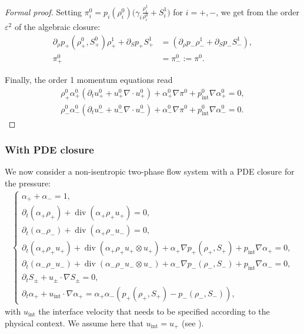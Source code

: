 \documentclass[11pt, twoside, a4paper]{article}
\theoremstyle{plain}
\theoremstyle{remark}
\numberwithin{equation}{section}
\renewcommand{\div}{\operatorname{div}}
\newcommand{\dt}{\partial_t}
\newcommand{\eps}{\varepsilon}
\newcommand{\ap}{\alpha_+}
\newcommand{\am}{\alpha_-}
\newcommand{\rp}{\rho_+}
\newcommand{\rmi}{\rho_-}
\begin{document}
\begin{proof}[Formal proof]
Setting $\pi_i^0 = p_i(\rho_i^0) \Big( \gamma_i \frac{\rho_i^1}{\rho_i^0} + S_i^1 \Big)$ for $i=+,-$, we get from the order $\eps^2$ of the algebraic closure:
\begin{align*}
    \partial_\rho p_+(\rp^0,S_+^0)\rp^1 + \partial_S p_+ S_+^1 &= (\partial_\rho p_- \rmi^1 + \partial_S p_- S_-^1),\\
    \pi_+^0 &= \pi_-^0 := \pi^0. 
\end{align*}

Finally, the order 1 momentum equations read
\begin{align*}
    \rp^0 \ap^0 ( \dt u_+^0 + u_+^0 \nabla \cdot u_+^0) + \ap^0 \nabla \pi^0 + p_{\mathrm{int}}^0 \nabla \ap^0 = 0,\\
    \rmi^0 \am^0 (\dt u_-^0 + u_-^0 \nabla \cdot u_-^0) + \am^0 \nabla \pi^0 + p_{\mathrm{int}}^0 \nabla \am^0 = 0.
\end{align*}

\end{proof}


\subsubsection{With PDE closure}

We now consider a non-isentropic two-phase flow system with a PDE closure for the pressure:
\begin{align*}
    \left\{
        \begin{array}{l}
            \ap + \am = 1,\\
            \dt (\ap \rp) + \div(\ap \rp u_+) = 0,\\
            \dt (\am \rmi) + \div(\ap \rmi u_-) = 0,\\
            \dt (\ap \rp u_+) + \div (\ap \rp u_+ \otimes u_+) + \ap \nabla p_+(\rp, S_+) + p_{\mathrm{int}} \nabla \ap = 0,\\
            \dt (\am \rmi u_-) + \div (\am \rmi u_- \otimes u_-) + \am \nabla p_-(\rmi, S_-) + p_{\mathrm{int}} \nabla \am = 0,\\
            \dt S_\pm + u_\pm \cdot \nabla S_\pm = 0,\\
            \dt \ap + u_{\mathrm{int}} \cdot \nabla \ap = \ap \am (p_+(\rp, S_+)-p_-(\rmi, S_-)),
        \end{array}
    \right.
\end{align*}
with $u_{\mathrm{int}}$ the interface velocity that needs to be specified according to the physical context. We assume here that $u_{\mathrm{int}} = u_+$ (see \cite{narbona2024two}). 
\end{document}
